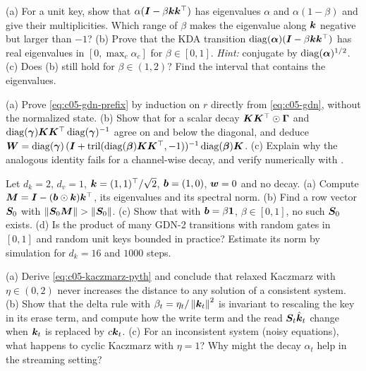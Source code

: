 \begin{exercise}\label{ex:c05-spectrum}
(a) For a unit key, show that $\alpha(\bm{I} - \beta\bm{k}\bm{k}^{\top})$ has eigenvalues $\alpha$ and
$\alpha(1-\beta)$ and give their multiplicities. Which range of $\beta$ makes the eigenvalue along
$\bm{k}$ negative but larger than $-1$? (b) Prove that the KDA transition
$\operatorname{diag}(\bm{\alpha})(\bm{I} - \beta\bm{k}\bm{k}^{\top})$ has real eigenvalues in $[0, \max_c\alpha_c]$ for
$\beta \in [0,1]$. \emph{Hint:} conjugate by $\operatorname{diag}(\bm{\alpha})^{1/2}$. (c) Does (b) still hold for
$\beta \in (1,2)$? Find the interval that contains the eigenvalues.
\end{exercise}

\begin{exercise}\label{ex:c05-chunk}
(a) Prove \cref{eq:c05-gdn-prefix} by induction on $r$ directly from \cref{eq:c05-gdn}, without
the normalized state. (b) Show that for a scalar decay
$\bm{K}\bm{K}^{\top}\odot\bm\Gamma$ and $\operatorname{diag}(\bm\gamma)\bm{K}\bm{K}^{\top}\operatorname{diag}(\bm\gamma)^{-1}$ agree on and below the
diagonal, and deduce $\bm{W} = \operatorname{diag}(\bm\gamma)\,(\bm{I} + \operatorname{tril}(\operatorname{diag}(\bm{\beta})\bm{K}\bm{K}^{\top},-1))^{-1}\operatorname{diag}(\bm{\beta})\bm{K}$.
(c) Explain why the analogous identity fails for a channel-wise decay, and verify numerically with
.
\end{exercise}

\begin{exercise}\label{ex:c05-gdn2-norm}
Let $d_k = 2$, $d_v = 1$, $\bm{k} = (1,1)^{\top}/\sqrt2$, $\bm{b} = (1,0)$, $\bm{w} = 0$ and no decay.
(a) Compute $\bm{M} = \bm{I} - (\bm{b}\odot\bm{k})\bm{k}^{\top}$, its eigenvalues and its spectral norm.
(b) Find a row vector $\bm{S}_0$ with $\left\lVert \bm{S}_0\bm{M}\right\rVert > \left\lVert \bm{S}_0\right\rVert$. (c) Show that with
$\bm{b} = \beta\mathbf 1$, $\beta\in[0,1]$, no such $\bm{S}_0$ exists. (d) Is the product of many GDN-2
transitions with random gates in $[0,1]$ and random unit keys bounded in practice? Estimate its
norm by simulation for $d_k = 16$ and $1000$ steps.
\end{exercise}

\begin{exercise}[Kaczmarz]\label{ex:c05-kaczmarz}
(a) Derive \cref{eq:c05-kaczmarz-pyth} and conclude that relaxed Kaczmarz with
$\eta\in(0,2)$ never increases the distance to any solution of a consistent system. (b) Show that
the delta rule with $\beta_t = \eta_t/\left\lVert \bm{k}_t\right\rVert^2$ is invariant to rescaling the key in its
erase term, and compute how the write term and the read $\bm{S}_t\hat{\bm{k}}_t$ change when $\bm{k}_t$ is
replaced by $c\bm{k}_t$. (c) For an inconsistent system (noisy equations), what happens to cyclic
Kaczmarz with $\eta = 1$? Why might the decay $\alpha_t$ help in the streaming setting?
\end{exercise}

